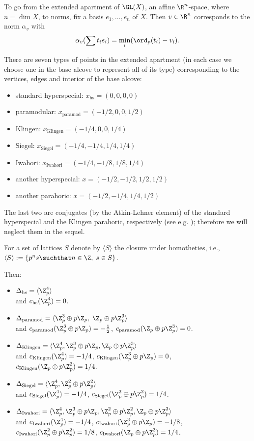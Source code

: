 \documentclass[a4paper]{scrartcl} %
\numberwithin{equation}{section}
\begin{document}
To go from the extended apartment of $\GL(X)$, an affine $\R^{n}$-space, where $n=\dim X$, to norms, fix a basis $e_1,\dotsc,e_n$ of $X$. Then $v\in\R^n$ corresponds to the norm $\alpha_v$ with
\begin{equation*}
  \alpha_v(\sum t_ie_i)=\min_i(\ord_p(t_i) - v_i).
\end{equation*}


There are seven types of points in the extended apartment (in each case we choose one in the base alcove to represent all of its type) corresponding to the vertices, edges and interior of the base alcove:
\begin{itemize}
\item standard hyperspecial: $x_\mathrm{hs}=(0,0,0,0)$
\item paramodular: $x_\mathrm{paramod}=(-1/2,0,0,1/2)$
\item Klingen: $x_\mathrm{Klingen}=(-1/4,0,0,1/4)$
\item Siegel: $x_\mathrm{Siegel}=(-1/4,-1/4,1/4,1/4)$
\item Iwahori: $x_\mathrm{Iwahori}=(-1/4,-1/8,1/8,1/4)$
\item another hyperspecial: $x=(-1/2,-1/2,1/2,1/2)$
\item another parahoric: $x=(-1/2,-1/4,1/4,1/2)$
\end{itemize}

The last two are conjugates (by the Atkin-Lehner element) of the standard hyperspecial and the Klingen parahoric, respectively (see e.g. \cite[151]{roesner}); therefore we will neglect them in the sequel.

For a set of lattices $S$ denote by $\langle S \rangle$ the closure under homotheties, i.e., $\langle S\rangle :=\{ p^n s \suchthat n\in \Z,\; s\in S\}$.

Then:
\begin{itemize}
\item $\Delta_\mathrm{hs}=\langle \Z_p^4\rangle$ \\ and $c_\mathrm{hs}(\Z_p^4)=0$.
\item $\Delta_\mathrm{paramod}=\langle \Z_p^3\oplus p\Z_p, \; \Z_p\oplus p\Z_p^3\rangle$ \\ and $c_\mathrm{paramod}(\Z_p^3\oplus p\Z_p)=-\frac{1}{2}$, $c_\mathrm{paramod}(\Z_p\oplus p\Z_p^3)=0$.
\item $\Delta_\mathrm{Klingen}=\langle \Z_p^4, \Z_p^3\oplus p\Z_p,\Z_p\oplus p\Z_p^3\rangle$
\\ and $c_\mathrm{Klingen}(\Z_p^4)=-1/4$, $c_\mathrm{Klingen}(\Z_p^3\oplus p\Z_p)=0$, $c_\mathrm{Klingen}(\Z_p\oplus p\Z_p^3)=1/4$.
\item $\Delta_\mathrm{Siegel}=\langle \Z_p^4, \Z_p^2\oplus p\Z_p^2\rangle$
\\ and $c_\mathrm{Siegel}(\Z_p^4)=-1/4$, $c_\mathrm{Siegel}(\Z_p^2\oplus p\Z_p^2)=1/4$.
\item $\Delta_\mathrm{Iwahori}=\langle \Z_p^4, \Z_p^3\oplus p\Z_p,\Z_p^2\oplus p\Z_p^2,\Z_p\oplus p\Z_p^3\rangle$
\\ and $c_\mathrm{Iwahori}(\Z_p^4)=-1/4$, $c_\mathrm{Iwahori}(\Z_p^3\oplus p\Z_p)=-1/8$, $c_\mathrm{Iwahori}(\Z_p^2\oplus p\Z_p^2)=1/8$, $c_\mathrm{Iwahori}(\Z_p\oplus p\Z_p^3)=1/4$.
\end{itemize}
\end{document}
